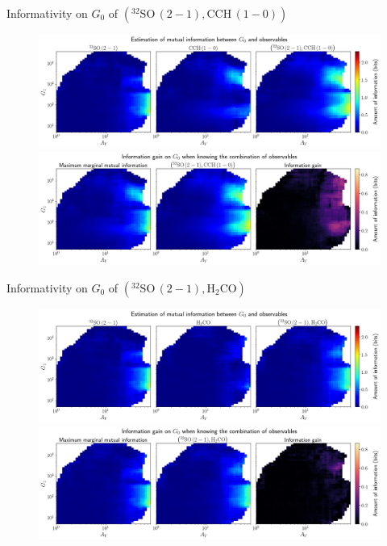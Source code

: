 \documentclass{beamer}
\begin{document}
\begin{frame}{Informativity on $G_0$ of $\left(\mathrm{^{32}SO\,(2-1)},\mathrm{CCH\,(1-0)}\right)$}
    \begin{figure}
        \centering
        \includegraphics[width=0.95\linewidth]{../mi/g0__32so21_cch10_mi.png}
        \vfill
        \includegraphics[width=0.95\linewidth]{../mi/g0__32so21_cch10_mi_gain.png}
    \end{figure}
\end{frame}

\begin{frame}{Informativity on $G_0$ of $\left(\mathrm{^{32}SO\,(2-1)},\mathrm{H_2CO}\right)$}
    \begin{figure}
        \centering
        \includegraphics[width=0.95\linewidth]{../mi/g0__32so21_h2co_mi.png}
        \vfill
        \includegraphics[width=0.95\linewidth]{../mi/g0__32so21_h2co_mi_gain.png}
    \end{figure}
\end{frame}
\end{document}
